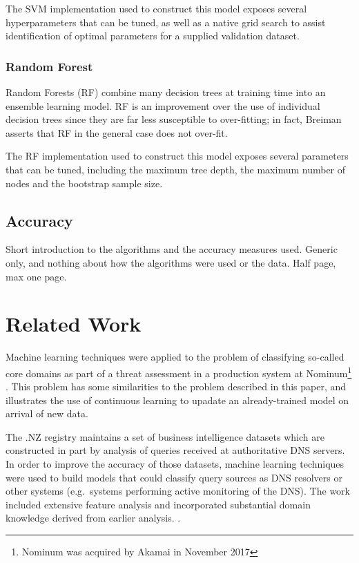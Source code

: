 \documentclass[conference]{IEEEtran}
\let\citep\cite
\begin{document}
The SVM implementation used to construct this model exposes several
hyperparameters that can be tuned, as well as a native grid search to
assist identification of optimal parameters for a supplied validation
dataset.

\subsubsection{Random Forest}\label{sec:random-forest}

Random Forests (RF) \citep{Breiman2001} combine many decision trees at
training time into an ensemble learning model. RF is an improvement over
the use of individual decision trees since they are far less susceptible
to over-fitting; in fact, Breiman asserts that RF in the general case
does not over-fit.

The RF implementation used to construct this model exposes several
parameters that can be tuned, including the maximum tree depth, the
maximum number of nodes and the bootstrap sample size.

\subsection{Accuracy}\label{sec:accuracy}

Short introduction to the algorithms and the accuracy measures used.
Generic only, and nothing about how the algorithms were used or the
data. Half page, max one page.

\section{Related Work}\label{sec:related-work}

\label{sec:related}

Machine learning techniques were applied to the problem of classifying
so-called core domains as part of a threat assessment in a production
system at
Nominum\footnote{Nominum was acquired by Akamai in November 2017}
\citep{Yuzifovichbotconf2017} \citep{YuzifovichOARC2017}. This problem
has some similarities to the problem described in this paper, and
illustrates the use of continuous learning to upadate an already-trained
model on arrival of new data.

The .NZ registry maintains a set of business intelligence datasets which
are constructed in part by analysis of queries received at authoritative
DNS servers. In order to improve the accuracy of those datasets, machine
learning techniques were used to build models that could classify query
sources as DNS resolvers or other systems (e.g.~systems performing
active monitoring of the DNS). The work included extensive feature
analysis and incorporated substantial domain knowledge derived from
earlier analysis. \citep{Qiao2018} \citep{QiaoOARC2018}.
\end{document}
